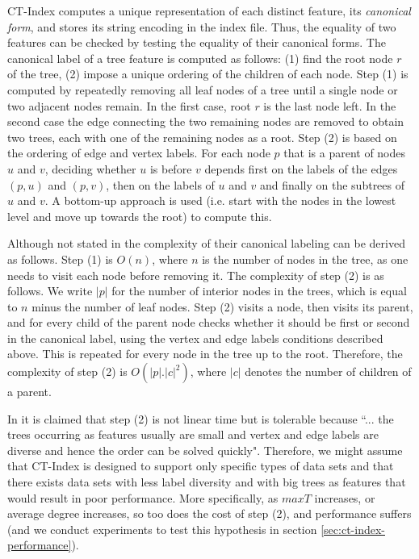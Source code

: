 \documentclass{l4proj}
\theoremstyle{definition}
\begin{document}
CT-Index computes a unique representation of each distinct feature, its \emph{canonical form}, and stores its string encoding in the index file. Thus, the equality of two features can be checked by testing the equality of their canonical forms. The canonical label of a tree feature is computed as follows: (1) find the root node $r$ of the tree, (2) impose a unique ordering of the children of each node. Step (1) is computed by repeatedly removing all leaf nodes of a tree until a single node or two adjacent nodes remain. In the first case, root $r$ is the last node left. In the second case the edge connecting the two remaining nodes are removed to obtain two trees, each with one of the remaining nodes as a root. 
Step (2) is based on the ordering of edge and vertex labels. For each node $p$ that is a parent of nodes $u$ and $v$, deciding whether $u$ is before $v$ depends first on the labels of the edges $(p,u)$ and $(p,v)$, then on the labels of $u$ and $v$ and finally on the subtrees of $u$ and $v$. A bottom-up approach is used (i.e. start with the nodes in the lowest level and move up towards the root) to compute this.

Although not stated in \cite{ctindex} the complexity of their canonical labeling can be derived as follows. Step (1) is $O(n)$, where $n$ is the number of nodes in the tree, as one needs to visit each node before removing it. The complexity of step (2) is as follows. We write $|p|$ for the number of interior nodes in the trees, which is equal to $n$ minus the number of leaf nodes. Step (2) visits a node, then visits its parent, and for every child of the parent node checks whether it should be first or second in the canonical label, using the vertex and edge labels conditions described above. This is repeated for every node in the tree up to the root. Therefore, the complexity of step (2) is $O(|p|.|c|^{2})$, where $|c|$ denotes the number of children of a parent.

In \cite{ctindex} it is claimed that step (2) is not linear time but is tolerable because ``... the trees occurring as features usually are small and vertex and edge labels are diverse and hence the order can be solved quickly". Therefore, we might assume that CT-Index is designed to support only specific types of data sets and that there exists data sets with less label diversity and with big trees as features that would result in poor performance. More specifically, as $maxT$ increases, or average degree increases, so too does the cost of step (2), and performance suffers (and we conduct experiments to test this hypothesis in section \ref{sec:ct-index-performance}).
\end{document}
